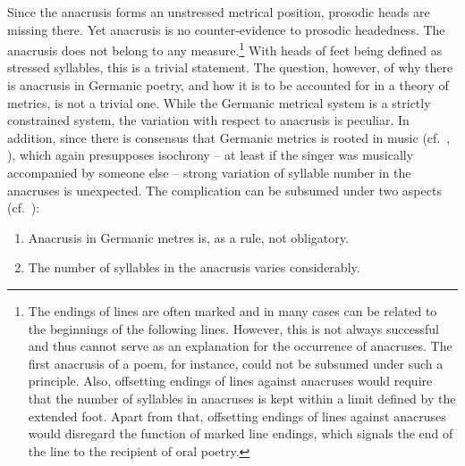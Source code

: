 \documentclass[output=paper
  ,nobabel
  ,uniformtopskip %
]{langscibook}
\begin{document}
\noindent
Since the anacrusis forms an unstressed metrical position, prosodic heads are missing there. Yet anacrusis is no counter-evidence to prosodic headedness. The anacrusis does not belong to any measure.\footnote{The endings of lines are often marked and in many cases can be related to the beginnings of the following lines. However, this is not always successful and thus cannot serve as an explanation for the occurrence of anacruses. The first anacrusis of a poem, for instance, could not be subsumed under such a principle. Also, offsetting endings of lines against anacruses would require that the number of syllables in anacruses is kept within a limit defined by the extended foot. Apart from that, offsetting endings of lines against anacruses would disregard the function of marked line endings, which signals the end of the line to the recipient of oral poetry.} With heads of feet being defined as stressed syllables, this is a trivial statement. The question, however, of why there is anacrusis in Germanic poetry, and how it is to be accounted for in a theory of metrics, is not a trivial one. While the Germanic metrical system is a strictly constrained system, the variation with respect to anacrusis is peculiar. In addition, since there is consensus that Germanic metrics is rooted in music (cf.\ \citealt{Hofmann1963}, \citealt{Jammers1964}), which again presupposes isochrony – at least if the singer was musically accompanied by someone else – strong variation of syllable number in the anacruses is unexpected. The complication can be subsumed under two aspects (cf.\ \citealt{NoelAzizHanna2010}):
\begin{enumerate}
    \item  Anacrusis in Germanic metres is, as a rule, not obligatory.

    \item The number of syllables in the anacrusis varies considerably.
\end{enumerate}
\end{document}

